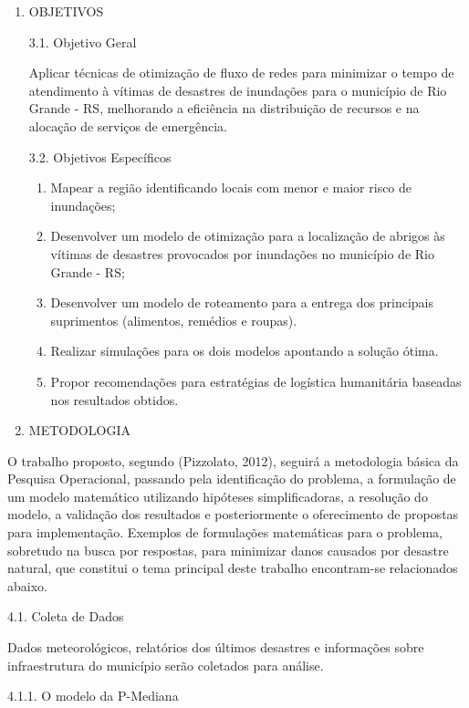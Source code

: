 \documentclass[
]{article}
\begin{document}
\begin{enumerate}
\def\labelenumi{\arabic{enumi}.}
\setcounter{enumi}{2}
\item
  OBJETIVOS

  3.1. Objetivo Geral

  Aplicar técnicas de otimização de fluxo de redes para minimizar o
  tempo de atendimento à vítimas de desastres de inundações para o
  município de Rio Grande - RS, melhorando a eficiência na distribuição
  de recursos e na alocação de serviços de emergência.

  3.2. Objetivos Específicos

  \begin{enumerate}
  \def\labelenumii{\arabic{enumii}.}
  \item
    Mapear a região identificando locais com menor e maior risco de
    inundações;
  \item
    Desenvolver um modelo de otimização para a localização de abrigos às
    vítimas de desastres provocados por inundações no município de Rio
    Grande - RS;
  \item
    Desenvolver um modelo de roteamento para a entrega dos principais
    suprimentos (alimentos, remédios e roupas).
  \item
    Realizar simulações para os dois modelos apontando a solução ótima.
  \item
    Propor recomendações para estratégias de logística humanitária
    baseadas nos resultados obtidos.
  \end{enumerate}
\item
  METODOLOGIA
\end{enumerate}

O trabalho proposto, segundo (Pizzolato, 2012), seguirá a metodologia
básica da Pesquisa Operacional, passando pela identificação do problema,
a formulação de um modelo matemático utilizando hipóteses
simplificadoras, a resolução do modelo, a validação dos resultados e
posteriormente o oferecimento de propostas para implementação. Exemplos
de formulações matemáticas para o problema, sobretudo na busca por
respostas, para minimizar danos causados por desastre natural, que
constitui o tema principal deste trabalho encontram-se relacionados
abaixo.

4.1. Coleta de Dados

Dados meteorológicos, relatórios dos últimos desastres e informações
sobre infraestrutura do município serão coletados para análise.

4.1.1. O modelo da P-Mediana
\end{document}
